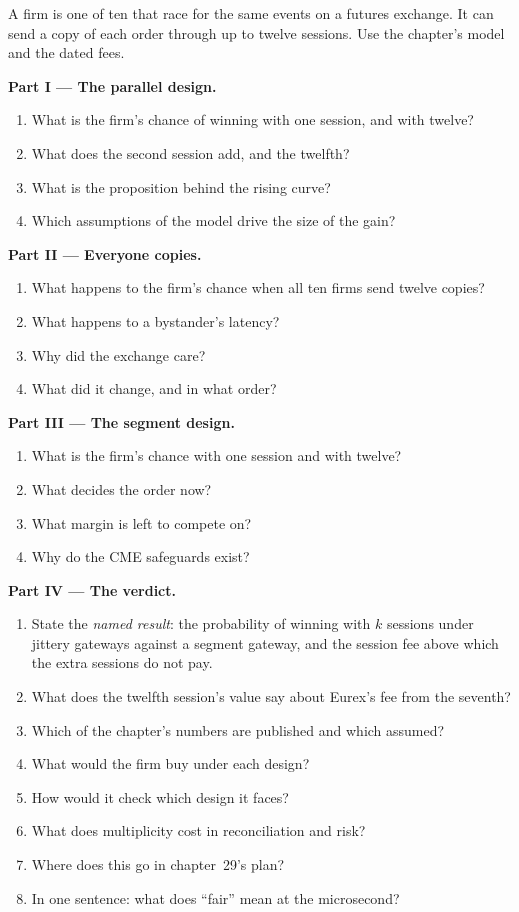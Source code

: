 \begin{problem}\label{pb:nw:futures-connectivity:1}
A firm is one of ten that race for the same events on a futures exchange. It can send a copy of each order through up to twelve
sessions. Use the chapter's model and the dated fees.

\medskip\noindent\textbf{Part I --- The parallel design.}
\begin{enumerate}
\item What is the firm's chance of winning with one session, and with twelve?
\item What does the second session add, and the twelfth?
\item What is the proposition behind the rising curve?
\item Which assumptions of the model drive the size of the gain?
\end{enumerate}

\medskip\noindent\textbf{Part II --- Everyone copies.}
\begin{enumerate}[resume]
\item What happens to the firm's chance when all ten firms send twelve copies?
\item What happens to a bystander's latency?
\item Why did the exchange care?
\item What did it change, and in what order?
\end{enumerate}

\medskip\noindent\textbf{Part III --- The segment design.}
\begin{enumerate}[resume]
\item What is the firm's chance with one session and with twelve?
\item What decides the order now?
\item What margin is left to compete on?
\item Why do the CME safeguards exist?
\end{enumerate}

\medskip\noindent\textbf{Part IV --- The verdict.}
\begin{enumerate}[resume]
\item State the \emph{named result}: the probability of winning with $k$ sessions under jittery gateways against a segment gateway,
  and the session fee above which the extra sessions do not pay.
\item What does the twelfth session's value say about Eurex's fee from the seventh?
\item Which of the chapter's numbers are published and which assumed?
\item What would the firm buy under each design?
\item How would it check which design it faces?
\item What does multiplicity cost in reconciliation and risk?
\item Where does this go in chapter~29's plan?
\item In one sentence: what does ``fair'' mean at the microsecond?
\end{enumerate}
\end{problem}

